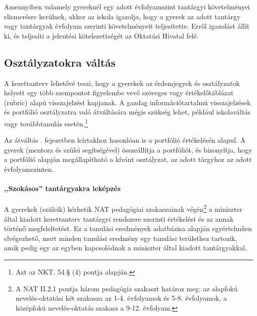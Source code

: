 Amennyiben valamely gyereknél egy adott évfolyamszint tantárgyi követelményei
elismerésre kerülnek, akkor az iskola igazolja, hogy a gyerek az adott tantárgy
vagy tantárgyak évfolyam szerinti követelményeit teljesítette.
Erről igazolást állít ki, és teljesíti a jelentési kötelezettségét az Oktatási
Hivatal felé.

\subsection{Osztályzatokra váltás}
\label{sec:osztalyzatok}
A kerettanterv lehetővé teszi, hogy a gyerekek az érdemjegyek
és osztályzatok
helyett egy több szempontot figyelembe vevő szöveges vagy értékelőtáblázat
(rubric) alapú visszajelzést kapjanak.
A gazdag információtartalmú visszajelzések és portfólió osztályzatra való
átváltására mégis szükség lehet, például iskolaváltás vagy továbbtanulás
esetén.\footnote{Azt az NKT. 54.§ (4) pontja alapján.}

Az átváltás .
fejezetben leírtakhoz
hasonlóan is a portfólió értékelésén alapul.
A gyerek (mentora és szülei segítségével) összeállítja a portfóliót, és
bizonyítja, hogy a portfólió alapján megállapítható a kívánt osztályzat, az
adott tárgyhoz az adott évfolyamszinten.

\paragraph{,,Szokásos'' tantárgyakra leképzés}
A gyerekek (szüleik) kérhetik NAT pedagógiai szakaszainak
végén\footnote{A NAT II.2.1 pontja három pedagógia szakaszt határoz meg: az
      alapfokú nevelés-oktatási két szakasza az 1-4. évfolyamok és 5-8.
      évfolyamok,
      a középfokú nevelés-oktatás szakasz a 9-12. évfolyam.}
a miniszter
által kiadott kerettanterv tantárgyi rendszere szerinti értékelést és az annak
történő megfeleltetést. Ez a tanulási eredmények adatbázisa alapján
egyértelműen elvégezhető, mert minden tanulási eredmény egy tanulási területhez
tartozik, amik pedig egy az egyben kapcsolódnak a miniszter által kiadott
tantárgyakkal.
